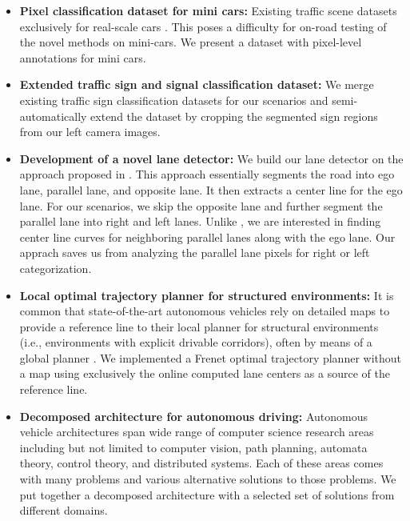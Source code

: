 \begin{itemize}
  \item \textbf{Pixel classification dataset for mini cars:} Existing traffic
    scene datasets exclusively for real-scale cars \cite{Huang2018TheAD,
    Cordts2016TheCD, Geiger2012AreWR, Neuhold2017TheMV}. This poses a
    difficulty for on-road testing of the novel methods on mini-cars. We
    present a dataset with pixel-level annotations for mini cars.
  \item \textbf{Extended traffic sign and signal classification dataset:} We
    merge existing traffic sign classification datasets
    \cite{Timofte2009MultiviewTS, Stallkamp2012ManVC, Shakhuro2016RussianTS,
    Serna2018ClassificationOT, MaldonadoBascn2007RoadSignDA} for our scenarios
    and semi-automatically extend the dataset by cropping the segmented sign
    regions from our left camera images.
  \item \textbf{Development of a novel lane detector:} We build our lane
    detector on the approach proposed in \cite{Meyer2018DeepSL}. This approach
    essentially segments the road into ego lane, parallel lane, and opposite
    lane. It then extracts a center line for the ego lane. For our scenarios,
    we skip the opposite lane and further segment the parallel lane into right
    and left lanes.  Unlike \cite{Meyer2018DeepSL}, we are interested in
    finding center line curves for neighboring parallel lanes along with the
    ego lane. Our apprach saves us from analyzing the parallel lane pixels for
    right or left categorization.
  \item \textbf{Local optimal trajectory planner for structured environments:}
    It is common that state-of-the-art autonomous vehicles rely on detailed
    maps to provide a reference line to their local planner for structural
    environments (i.e., environments with explicit drivable corridors), often
    by means of a global planner \cite{Thrun2006StanleyTR,
    Montemerlo2009JuniorTS, Kato2018AutowareOB}. We implemented a Frenet
    optimal trajectory planner \cite{Werling2010OptimalTG} without a map using
    exclusively the online computed lane centers as a source of the reference
    line.
  \item \textbf{Decomposed architecture for autonomous driving:} Autonomous
    vehicle architectures span wide range of computer science research areas
    including but not limited to computer vision, path planning, automata
    theory, control theory, and distributed systems. Each of these areas comes
    with many problems and various alternative solutions to those problems. We
    put together a decomposed architecture with a selected set of solutions
    from different domains.
\end{itemize}

